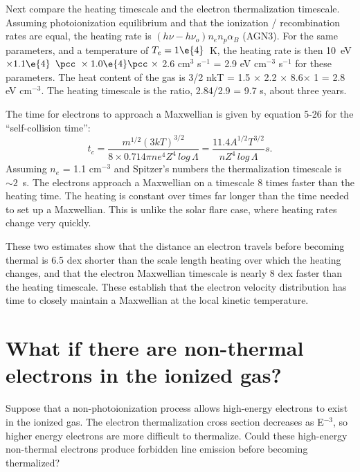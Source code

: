 \documentclass[debug, preprint, twocolumn]{rmaa}
\begin{document}
Next compare the heating timescale and the electron thermalization timescale.  
Assuming photoionization equilibrium and that the ionization / recombination rates are equal, 
the heating rate is $(h\nu - h\nu_o) n_e n_p \alpha_B$ (AGN3).
For the same parameters, 
and a temperature of $T_{e} = 1\e{4}$~K,
the heating rate is then 
10~eV $\times 1.1\e{4}$ 
$\pcc\ \times 1.0\e{4} \pcc\  \times $
2.6 cm$^3$ s$^{-1}$ = 2.9 eV cm$^{-3}$ s$^{-1}$ 
for these parameters.  
The heat content of the gas is 
3/2 nkT = 1.5 $\times$ 2.2 $\times$ 8.6$\times$ 1   = 2.8 eV cm$^{-3}$.  
The heating timescale is the ratio, 2.84/2.9 = 9.7 s, about three years.  

The time for electrons to approach a Maxwellian is given by \citet{Spitzer1962} 
equation 5-26 for the ``self-collision time'':
\begin{equation}
t_c = \frac{m^{1/2} (3kT)^{3/2}}{8\times 0.714 \pi n e^4 Z^4 \, log\, \Lambda}
= \frac{11.4 A^{1/2} T^{3/2}}{nZ^4 \, log\, \Lambda} s.
\end{equation}
Assuming $n_e$ = 1.1 cm$^{-3}$ and Spitzer's numbers the thermalization timescale is $\sim 2$~s.  
The electrons approach a Maxwellian on a timescale 8 times faster than the heating time.  
The heating is constant over times far longer than the time needed to set up a Maxwellian.
This is unlike the solar flare case, where heating rates change very quickly.

These two estimates show that the distance an electron travels
before becoming thermal is 6.5 dex shorter than the scale length heating over which the heating changes, 
and that the electron Maxwellian timescale is nearly 8 dex faster than the heating timescale.  
These establish that the electron velocity distribution has time to closely 
maintain a Maxwellian at the local kinetic temperature.


\section{What if there are non-thermal electrons in the ionized gas?}
\label{sec:WhatIf}

Suppose that a non-photoionization process allows high-energy electrons to exist in the ionized gas.
The electron thermalization cross section
decreases as E$^{-3}$, so higher energy electrons are more difficult to thermalize.
Could these high-energy non-thermal electrons produce forbidden line emission before becoming thermalized?  
\end{document}
